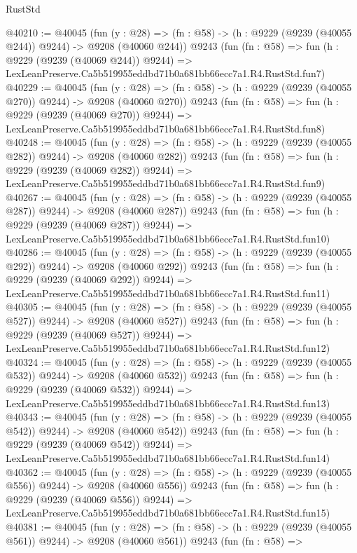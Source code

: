 \begin{lexlean}{RustStd}
\begin{coremodule}
@40210 := @40045
    (fun (y : @28) => (fn : @58) -> (h : @9229 (@9239 (@40055 @244)) @9244) -> @9208 (@40060 @244))
    @9243
    (fun (fn : @58) =>
    fun (h : @9229 (@9239 (@40069 @244)) @9244) =>
    LexLeanPreserve.Ca5b519955eddbd71b0a681bb66ecc7a1.R4.RustStd.fun7)
@40229 := @40045
    (fun (y : @28) => (fn : @58) -> (h : @9229 (@9239 (@40055 @270)) @9244) -> @9208 (@40060 @270))
    @9243
    (fun (fn : @58) =>
    fun (h : @9229 (@9239 (@40069 @270)) @9244) =>
    LexLeanPreserve.Ca5b519955eddbd71b0a681bb66ecc7a1.R4.RustStd.fun8)
@40248 := @40045
    (fun (y : @28) => (fn : @58) -> (h : @9229 (@9239 (@40055 @282)) @9244) -> @9208 (@40060 @282))
    @9243
    (fun (fn : @58) =>
    fun (h : @9229 (@9239 (@40069 @282)) @9244) =>
    LexLeanPreserve.Ca5b519955eddbd71b0a681bb66ecc7a1.R4.RustStd.fun9)
@40267 := @40045
    (fun (y : @28) => (fn : @58) -> (h : @9229 (@9239 (@40055 @287)) @9244) -> @9208 (@40060 @287))
    @9243
    (fun (fn : @58) =>
    fun (h : @9229 (@9239 (@40069 @287)) @9244) =>
    LexLeanPreserve.Ca5b519955eddbd71b0a681bb66ecc7a1.R4.RustStd.fun10)
@40286 := @40045
    (fun (y : @28) => (fn : @58) -> (h : @9229 (@9239 (@40055 @292)) @9244) -> @9208 (@40060 @292))
    @9243
    (fun (fn : @58) =>
    fun (h : @9229 (@9239 (@40069 @292)) @9244) =>
    LexLeanPreserve.Ca5b519955eddbd71b0a681bb66ecc7a1.R4.RustStd.fun11)
@40305 := @40045
    (fun (y : @28) => (fn : @58) -> (h : @9229 (@9239 (@40055 @527)) @9244) -> @9208 (@40060 @527))
    @9243
    (fun (fn : @58) =>
    fun (h : @9229 (@9239 (@40069 @527)) @9244) =>
    LexLeanPreserve.Ca5b519955eddbd71b0a681bb66ecc7a1.R4.RustStd.fun12)
@40324 := @40045
    (fun (y : @28) => (fn : @58) -> (h : @9229 (@9239 (@40055 @532)) @9244) -> @9208 (@40060 @532))
    @9243
    (fun (fn : @58) =>
    fun (h : @9229 (@9239 (@40069 @532)) @9244) =>
    LexLeanPreserve.Ca5b519955eddbd71b0a681bb66ecc7a1.R4.RustStd.fun13)
@40343 := @40045
    (fun (y : @28) => (fn : @58) -> (h : @9229 (@9239 (@40055 @542)) @9244) -> @9208 (@40060 @542))
    @9243
    (fun (fn : @58) =>
    fun (h : @9229 (@9239 (@40069 @542)) @9244) =>
    LexLeanPreserve.Ca5b519955eddbd71b0a681bb66ecc7a1.R4.RustStd.fun14)
@40362 := @40045
    (fun (y : @28) => (fn : @58) -> (h : @9229 (@9239 (@40055 @556)) @9244) -> @9208 (@40060 @556))
    @9243
    (fun (fn : @58) =>
    fun (h : @9229 (@9239 (@40069 @556)) @9244) =>
    LexLeanPreserve.Ca5b519955eddbd71b0a681bb66ecc7a1.R4.RustStd.fun15)
@40381 := @40045
    (fun (y : @28) => (fn : @58) -> (h : @9229 (@9239 (@40055 @561)) @9244) -> @9208 (@40060 @561))
    @9243
    (fun (fn : @58) =>

\end{coremodule}
\end{lexlean}
